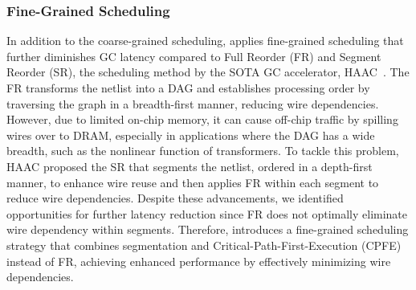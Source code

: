 \subsubsection{\textbf{Fine-Grained Scheduling}}
In addition to the coarse-grained scheduling, \sysname applies fine-grained scheduling that further diminishes GC latency compared to Full Reorder (FR) and Segment Reorder (SR), the scheduling method by the SOTA GC accelerator, HAAC~\cite{mo2023haac}. The FR transforms the netlist into a DAG and establishes processing order by traversing the graph in a breadth-first manner, reducing wire dependencies. However, due to limited on-chip memory, it can cause off-chip traffic by spilling wires over to DRAM, especially in applications where the DAG has a wide breadth, such as the nonlinear function of transformers. To tackle this problem, HAAC proposed the SR that segments the netlist, ordered in a depth-first manner, to enhance wire reuse and then applies FR within each segment to reduce wire dependencies. 
Despite these advancements, we identified opportunities for further latency reduction since FR does not optimally eliminate wire dependency within segments. Therefore, \sysname introduces a fine-grained scheduling strategy that combines segmentation and Critical-Path-First-Execution (CPFE)~\cite{zhao2020dag, zhao2022dag} instead of FR, achieving enhanced performance by effectively minimizing wire dependencies.

